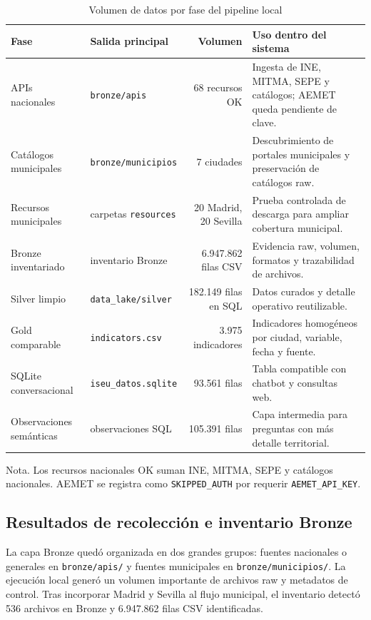 \begin{table}[htbp]
\caption{Volumen de datos por fase del pipeline local}
\label{tab:datos-por-fase}
\centering
\small
\begin{tabular}{p{} p{} r p{}}
\toprule
\textbf{Fase} & \textbf{Salida principal} & \textbf{Volumen} & \textbf{Uso dentro del sistema} \\
\midrule
APIs nacionales & \texttt{bronze/apis} & 68 recursos OK & Ingesta de INE, MITMA, SEPE y catálogos; AEMET queda pendiente de clave. \\
Catálogos municipales & \texttt{bronze/municipios} & 7 ciudades & Descubrimiento de portales municipales y preservación de catálogos raw. \\
Recursos municipales & carpetas \texttt{resources} & 20 Madrid, 20 Sevilla & Prueba controlada de descarga para ampliar cobertura municipal. \\
Bronze inventariado & inventario Bronze & 6.947.862 filas CSV & Evidencia raw, volumen, formatos y trazabilidad de archivos. \\
Silver limpio & \texttt{data\_lake/silver} & 182.149 filas en SQL & Datos curados y detalle operativo reutilizable. \\
Gold comparable & \texttt{indicators.csv} & 3.975 indicadores & Indicadores homogéneos por ciudad, variable, fecha y fuente. \\
SQLite conversacional & \texttt{iseu\_datos.sqlite} & 93.561 filas & Tabla compatible con chatbot y consultas web. \\
Observaciones semánticas & observaciones SQL & 105.391 filas & Capa intermedia para preguntas con más detalle territorial. \\
\bottomrule
\end{tabular}
\vspace{0.4em}
\begin{flushleft}
\small Nota. Los recursos nacionales OK suman INE, MITMA, SEPE y catálogos nacionales. AEMET se registra como \texttt{SKIPPED\_AUTH} por requerir \texttt{AEMET\_API\_KEY}.
\end{flushleft}
\end{table}

\subsection{Resultados de recolección e inventario Bronze}

La capa Bronze quedó organizada en dos grandes grupos: fuentes nacionales o generales en \texttt{bronze/apis/} y fuentes municipales en \texttt{bronze/municipios/}. La ejecución local generó un volumen importante de archivos raw y metadatos de control. Tras incorporar Madrid y Sevilla al flujo municipal, el inventario detectó 536 archivos en Bronze y 6.947.862 filas CSV identificadas.

